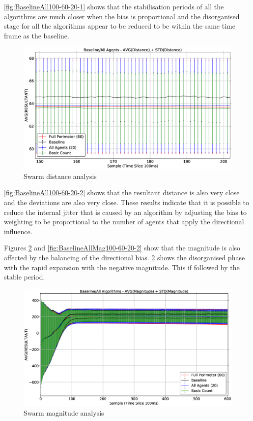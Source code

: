\autoref{fig:BaselineAll100-60-20-1} shows that the stabilisation periods of all the algorithms are much closer when the bias is proportional and the disorganised stage for all the algorithms appear to be reduced to be within the same time frame as the baseline.

\begin{figure}[H]
\begin{center}
\includegraphics[width=14cm]{CHAPTER-6/figures/BaselineAll100-60-20-2}
\end{center}
\caption{Swarm distance analysis\label{fig:BaselineAll100-60-20-2}}
\end{figure}

\autoref{fig:BaselineAll100-60-20-2} shows that the resultant distance is also very close and the deviations are also very close. These results indicate that it is possible to reduce the internal jitter that is caused by an algorithm by adjusting the bias to weighting to be proportional to the number of agents that apply the directional influence.

Figures \ref{fig:BaselineAllMag100-60-20-1} and \ref{fig:BaselineAllMag100-60-20-2} show that the magnitude is also affected by the balancing of the directional bias. \ref{fig:BaselineAllMag100-60-20-1} shows the disorganised phase with the rapid expansion with the negative magnitude. This if followed by the stable period. 

\begin{figure}[H]
\begin{center}
\includegraphics[width=14cm]{CHAPTER-6/figures/BaselineAllMag100-60-20-1}
\end{center}
\caption{Swarm magnitude analysis\label{fig:BaselineAllMag100-60-20-1}}
\end{figure}

